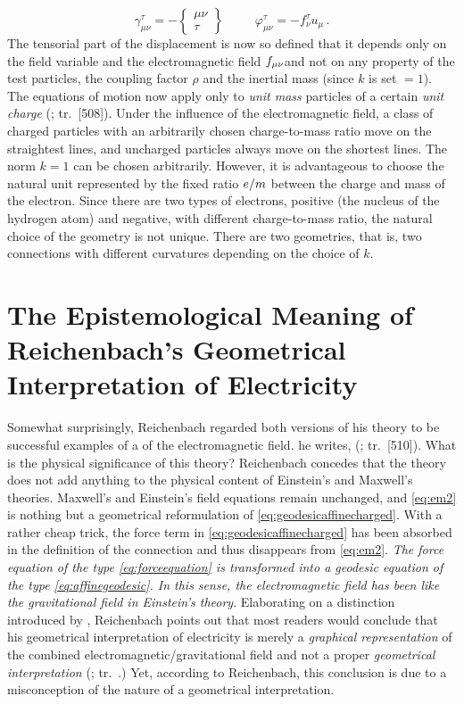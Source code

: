 \documentclass[final]{article}
\newcommand{\faradaymn}{\ensuremath{f\mn}}
\newcommand{\ctmr}{charge-to-mass ratio\xspace}
\newcommand{\ctmrf}{\ensuremath{\hfrac{e}{m}}\xspace}
\renewcommand{\rzlp}[2]{(\cite[#1]{Reichenbach1928}; tr.\ #2)\xspace}
\renewcommand{\rzlap}[2]{(\cite[#1]{Reichenbach1928}; tr.\ [#2])\xspace}
\begin{document}
\begin{equation}
\label{eq:dsd2}
\gamma^\tau_{\mu\nu}=-\begin{Bmatrix} \mu\nu \\ \tau \end{Bmatrix} \;\;\;\;\;\;\;\;\; \varphi_{\mu \nu}^{\tau}=- f_\nu^{\tau} u_{\mu}\,.
\end{equation}
%
The tensorial part of the displacement is now so defined that it depends only on the field variable and the electromagnetic field \faradaymn and not on any property of the test particles, \ie the coupling factor $\rho$ and the inertial mass (since $k$ is set $=1$). The equations of motion now apply only to \emph{unit mass} particles of a certain \emph{unit charge} \rzlap{363\f}{508\ff}. Under the influence of the electromagnetic field, a class of charged particles with an arbitrarily chosen \ctmr move on the straightest lines, and uncharged particles always move on the shortest lines. The norm $k=1$ can be chosen arbitrarily. However, it is advantageous to choose the natural unit represented by the fixed ratio \ctmrf between the charge and mass of the electron. Since there are two types of electrons, positive (the nucleus of the hydrogen atom) and negative, with different \ctmr, the natural choice of the geometry is not unique. There are two  geometries, that is, two connections \Gtmn with different curvatures depending on the choice of $k$.
 
\section{The Epistemological Meaning of Reichenbach's Geometrical Interpretation of Electricity}
%
Somewhat surprisingly, Reichenbach regarded both versions of his theory to be successful examples of a  of the electromagnetic field.  he writes,  \rzlap{365}{510}. What is the physical significance of this theory? Reichenbach concedes that the theory does not add anything to the physical content of Einstein's and Maxwell's theories. Maxwell's and Einstein's field equations remain unchanged, and \cref{eq:em2} is nothing but a geometrical reformulation of \cref{eq:geodesicaffinecharged}. With a rather cheap trick, the force term in \cref{eq:geodesicaffinecharged} has been absorbed in the definition of the connection and thus disappears from \cref{eq:em2}. \emph{The force equation of the type \cref{eq:forceequation} is transformed into a geodesic equation of the type \cref{eq:affinegeodesic}. In this sense, the electromagnetic field has been  like the gravitational field in Einstein's theory}. Elaborating on a distinction introduced by \citet{Eddington1925a}, Reichenbach points out that most readers would conclude that his geometrical interpretation of electricity is merely a \emph{graphical representation} of the combined electromagnetic/gravitational field and not a proper \emph{geometrical interpretation} \rzlp{\S15}. Yet, according to Reichenbach, this conclusion is due to a misconception of the nature of a geometrical interpretation. 
\end{document}
